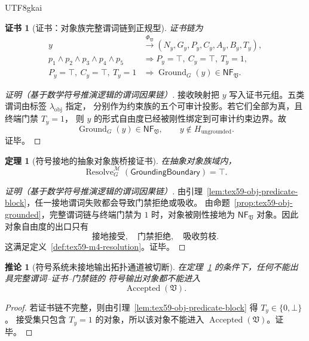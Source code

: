\documentclass[12pt]{article}
\newtheorem{theorem}{定理}[section]
\newtheorem{corollary}{推论}[section]
\newtheorem{Certificate}{证书}[section]
\newcommand{\Vsys}{\mathfrak V}
\newcommand{\NF}{\mathsf{NF}}
\DeclareMathOperator{\Accepted}{Accepted}
\DeclareMathOperator{\Resolve}{Resolve}
\DeclareMathOperator{\Ground}{Ground}
\begin{document}
\begin{CJK*}{UTF8}{gkai}
\begin{Certificate}[证书：对象族完整谓词链到正规型]
\label{cert:tex59-obj-grounded}
证书链为
\[
  \begin{aligned}
  y
  &\xrightarrow{\Phi_{\Vsys}}
  (N_y,G_y,P_y,C_y,A_y,B_y,T_y),\\
  p_1\wedge p_2\wedge p_3\wedge p_4\wedge p_5
  &\Longrightarrow
  P_y=\top,\ C_y=\top,\ T_y=1,\\
  P_y=\top,\ C_y=\top,\ T_y=1
  &\Longrightarrow
  \Ground_G(y)\in\NF_{\Vsys}.
  \end{aligned}
\]
\end{Certificate}

\begin{proof}[证明（基于数学符号推演逻辑的谓词因果链）]
接收映射把 \(y\) 写入证书元组。五类谓词由标签 \(\lambda_{\mathrm{obj}}\) 指定，
分别作为约束族的五个可审计投影。若它们全部为真，且终端门禁 \(T_y=1\)，
则 \(y\) 的形式自由度已经被刚性绑定到可审计约束边界。故
\[
  \Ground_G(y)\in\NF_{\Vsys},
  \qquad
  y\notin H_{\mathrm{ungrounded}}.
\]
证毕。
\end{proof}

\begin{theorem}[符号接地的抽象对象族桥接证书]
\label{thm:tex59-m4-ground}
在抽象对象族域内，
\[
  \Resolve_G^{\mathcal M}(\mathsf{GroundingBoundary})=\top.
\]
\end{theorem}

\begin{proof}[证明（基于数学符号推演逻辑的谓词因果链）]
由引理~\ref{lem:tex59-obj-predicate-block}，任一接地谓词失败都会导致门禁拒绝或吸收。
由命题~\ref{prop:tex59-obj-grounded}，完整谓词链与终端门禁为 \(1\) 时，对象被刚性接地为
\(\NF_{\Vsys}\) 对象。因此对象自由度的出口只有
\[
  \text{接地接受},\quad \text{门禁拒绝},\quad \text{吸收剪枝}.
\]
这满足定义~\ref{def:tex59-m4-resolution}。证毕。
\end{proof}

\begin{corollary}[符号系统未接地输出拓扑通道被切断]
\label{cor:tex59-obj-ungrounded-cut}
在定理~\ref{thm:tex59-m4-ground} 的条件下，任何不能出具完整谓词--证书--门禁链的
符号输出对象都不能进入
\[
  \Accepted(\Vsys).
\]
\end{corollary}

\begin{proof}
若证书链不完整，则由引理~\ref{lem:tex59-obj-predicate-block} 得 \(T_y\in\{0,\bot\}\)。
接受集只包含 \(T_y=1\) 的对象，所以该对象不能进入 \(\Accepted(\Vsys)\)。证毕。
\end{proof}


\end{CJK*}
\end{document}
